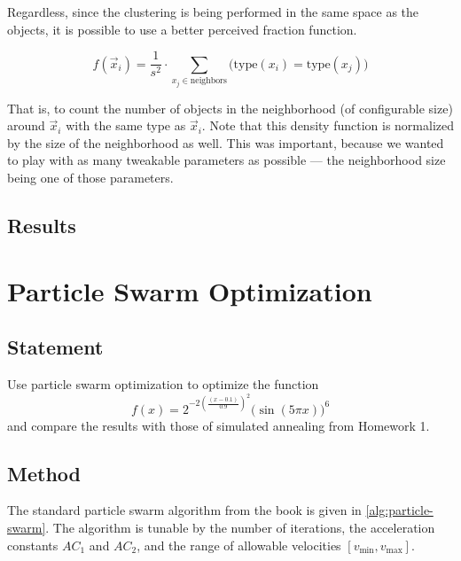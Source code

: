 \documentclass[12pt]{article}
\begin{document}
Regardless, since the clustering is being performed in the same space as the objects, it is possible to use a better perceived fraction function.

\begin{equation}
    f(\vec x_i) = \frac{1}{s^2}\cdot\sum_{x_j \in \text{neighbors}}\bigg(\mathrm{type}(x_i) = \mathrm{type}(x_j)\bigg)\label{eq:aca:density}
\end{equation}

That is, to count the number of objects in the neighborhood (of configurable size) around $\vec x_i$ with the same type as $\vec x_i$.
Note that this density function is normalized by the size of the neighborhood as well.
This was important, because we wanted to play with as many tweakable parameters as possible --- the neighborhood size being one of those parameters.

\subsection{Results}

\section{Particle Swarm Optimization}

\subsection{Statement}

Use particle swarm optimization to optimize the function
\begin{equation}
    f(x) = 2^{-2{\left(\frac{(x - 0.1)}{0.9}\right)}^2}{\big(\sin(5\pi x)\big)}^6\label{eq:pso:objective}
\end{equation}
and compare the results with those of simulated annealing from Homework 1.

\subsection{Method}

The standard particle swarm algorithm from the book is given in \autoref{alg:particle-swarm}.
The algorithm is tunable by the number of iterations, the acceleration constants $AC_1$ and $AC_2$, and the range of allowable velocities $[v_{\min}, v_{\max}]$.
\end{document}
